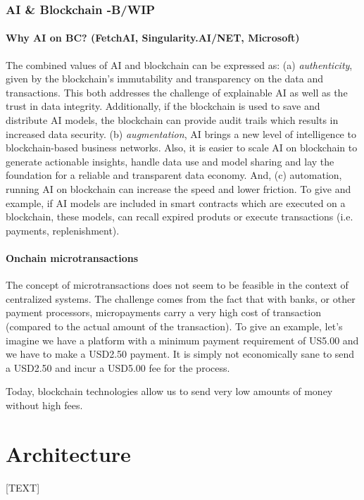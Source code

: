 \documentclass{article}
\begin{document}
\subsubsection{AI \& Blockchain -B/WIP}

\paragraph{Why AI on BC? (FetchAI, Singularity.AI/NET, Microsoft)}
The combined values of AI and blockchain can be expressed as: (a) \emph{authenticity}, given by the blockchain's immutability and transparency on the data and transactions. This both addresses the challenge of explainable AI as well as the trust in data integrity. Additionally, if the blockchain is used to save and distribute AI models, the blockchain can provide audit trails which results in increased data security. (b) \emph{augmentation}, AI brings a new level of intelligence to blockchain-based business networks. Also, it is easier to scale AI on blockchain to generate actionable insights, handle data use and model sharing and lay the foundation for a reliable and transparent data economy. And, (c) automation, running AI on blockchain can increase the speed and lower friction. To give and example, if AI models are included in smart contracts which are executed on a blockchain, these models, can recall expired produts or execute transactions (i.e. payments, replenishment).\cite{blockchain-ai}
\paragraph{Onchain microtransactions}
The concept of microtransactions does not seem to be feasible in the context of centralized systems. The challenge comes from the fact that with banks, or other payment processors, micropayments carry a very high cost of transaction (compared to the actual amount of the transaction).
To give an example, let's imagine we have a platform with a minimum payment requirement of US5.00 and we have to make a USD2.50 payment. It is simply not economically sane to send a USD2.50 and incur a USD5.00 fee for the process.

Today, blockchain technologies allow us to send very low amounts of money without high fees. 

\section{Architecture}


[TEXT]
\end{document}
